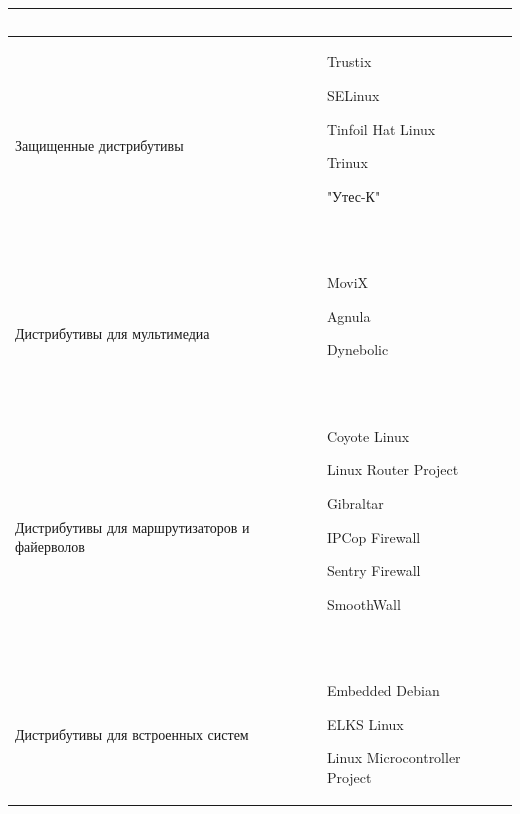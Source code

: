 \documentclass[bachelor, och, referat, times]{SCWorks}
\begin{document}
\begin{longtable}{|p{}|p{}|}
\begin{minipage}{\textwidth}
        ~
    \end{minipage}
    \\\hline
    Защищенные дистрибутивы &
    \begin{minipage}{\textwidth}
        \begin{list}{•}{~}
            \item Trustix
            \item SELinux
            \item Tinfoil Hat Linux
            \item Trinux
            \item "Утес-К"
        \end{list}
        ~
    \end{minipage}
    \\\hline
    Дистрибутивы для мультимедиа &
    \begin{minipage}{\textwidth}
        \begin{list}{•}{~}
            \item MoviX
            \item Agnula
            \item Dynebolic
        \end{list}
        ~
    \end{minipage}
    \\\hline
    Дистрибутивы для маршрутизаторов и файерволов &
    \begin{minipage}{\textwidth}
        \begin{list}{•}{~}
            \item Coyote Linux
            \item Linux Router Project
            \item Gibraltar
            \item IPCop Firewall
            \item Sentry Firewall
            \item SmoothWall
        \end{list}
        ~
    \end{minipage}
    \\\hline
    Дистрибутивы для встроенных систем &
    \begin{minipage}{\textwidth}
        \begin{list}{•}{~}
            \item Embedded Debian
            \item ELKS Linux
            \item Linux Microcontroller Project
        \end{list}

\end{minipage}
\end{longtable}
\end{document}
